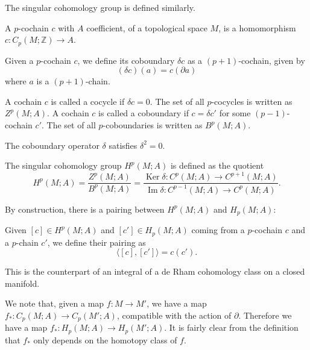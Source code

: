 \documentclass[12pt]{article}
\numberwithin{equation}{section}
\numberwithin{figure}{section}
\theoremstyle{remark}
\def\bZ{\mathbb{Z}}
\def\Ker{\mathop{\mathrm{Ker}}}
\def\Im{\mathop{\mathrm{Im}}}
\begin{document}
The singular cohomology group is defined similarly. 
\begin{definition}
A $p$-cochain $c$ with $A$ coefficient, of a topological space $M$, is a homomorphism $c:C_p(M;\bZ)\to A$.
\end{definition}

\begin{definition}
  Given a $p$-cochain $c$, we define its coboundary $\delta c$ as a $(p+1)$-cochain, given by \begin{equation}
    (\delta c)(a) = c(\partial a)
  \end{equation} where $a$ is a $(p+1)$-chain.
\end{definition}

\begin{definition}
A cochain $c$ is called a cocycle if $\delta c=0$.
The set of all $p$-cocycles is written as $Z^p(M;A)$.
A cochain $c$ is called a coboundary if $c=\delta c'$ for some $(p-1)$-cochain $c'$.
The set of all $p$-coboundaries is written as $B^p(M;A)$.
\end{definition}


\begin{proposition}
The coboundary operator $\delta$ satisfies $\delta^2=0$.
\end{proposition}

\begin{definition}
The singular cohomology group $H^p(M;A)$ is defined as the quotient \begin{equation}
H^p(M;A) = \frac{Z^p(M;A)}{B^p(M;A)} = \frac{\Ker \delta: C^p(M;A)\to C^{p+1}(M;A)}{\Im \delta: C^{p-1}(M;A)\to C^p(M;A)}.
\end{equation}
\end{definition}

By construction, there is a pairing between $H^p(M;A)$ and $H_p(M;A)$:
\begin{definition}
Given  $[c]\in H^p(M;A)$ and $[c']\in H_p(M;A)$
coming from a $p$-cochain $c$ and a $p$-chain $c'$,
we define their pairing as \begin{equation}
\langle [c],[c']\rangle = c(c').
\end{equation}
\end{definition}
This is the counterpart of an integral of a de Rham cohomology class on a closed manifold.

We note that, given a map $f:M\to M'$,
we have a map $f_*:C_p(M;A)\to C_p(M';A)$, 
compatible with the action of $\partial$.
Therefore we have a map $f_*: H_p(M;A)\to H_p(M';A)$.
It is fairly clear from the definition that $f_*$ only depends on the homotopy class of $f$.
\end{document}

